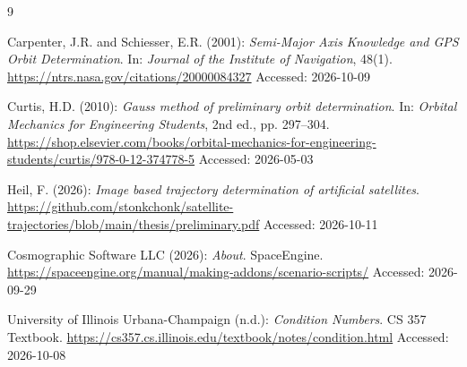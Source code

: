\documentclass[10pt,a4paper]{article}
\begin{document}
	\onecolumn
	\begin{thebibliography}{9}
		\setlength{\itemsep}{4pt}       %
		\setlength{\parskip}{0pt}       %
		\setlength{\parsep}{0pt}        %
		
		Carpenter, J.R. and Schiesser, E.R. (2001):
		\emph{Semi-Major Axis Knowledge and GPS Orbit Determination}.
		In: \emph{Journal of the Institute of Navigation}, 48(1).
		\newline
		\url{https://ntrs.nasa.gov/citations/20000084327}
		\newline
		Accessed: 2026-10-09
		
		 Curtis, H.D. (2010): \emph{Gauss method of preliminary orbit determination}. In: \emph{Orbital Mechanics for Engineering Students}, 2nd ed., pp. 297--304. \newline \url{https://shop.elsevier.com/books/orbital-mechanics-for-engineering-students/curtis/978-0-12-374778-5} \newline Accessed: 2026-05-03 
		
		 Heil, F. (2026): \emph{Image based trajectory determination of artificial satellites}. \newline \url{https://github.com/stonkchonk/satellite-trajectories/blob/main/thesis/preliminary.pdf} \newline Accessed: 2026-10-11
		
		 Cosmographic Software LLC (2026): \emph{About}. SpaceEngine. \newline \url{https://spaceengine.org/manual/making-addons/scenario-scripts/} \newline Accessed: 2026-09-29 
		
		 University of Illinois Urbana-Champaign (n.d.): \emph{Condition Numbers}. CS 357 Textbook. \newline \url{https://cs357.cs.illinois.edu/textbook/notes/condition.html} \newline Accessed: 2026-10-08
	\end{thebibliography}
\end{document}
